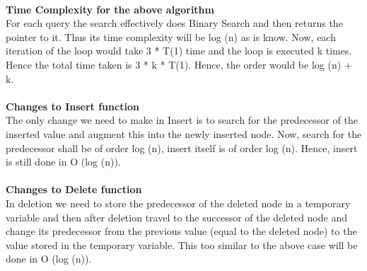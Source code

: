 \documentclass[a4paper,11pt]{article}
\theoremstyle{mytheor}
\begin{document}
\\
\textbf{Time Complexity for the above algorithm}\\
For each query the search effectively does Binary Search and then returns the pointer to it. Thus its time complexity will be log (n) as is know. Now, each iteration of the loop would take 3 * T(1) time and the loop is executed k times. Hence the total time taken is 3 * k * T(1). Hence, the order would be log (n) + k.\\
\\
\textbf{Changes to Insert function}\\
The only change we need to make in Insert is to search for the predecessor of the inserted value and augment this into the newly inserted node. Now, search for the predecessor shall be of order log (n), insert itself is of order log (n). Hence, insert is still done in O (log (n)).\\
\\
\textbf{Changes to Delete function}\\
In deletion we need to store the predecessor of the deleted node in a temporary variable and then after deletion travel to the successor of the deleted node and change its predecessor from the previous value (equal to the deleted node) to the value stored in the temporary variable.
This too similar to the above case will be done in O (log (n)).
\end{document}

